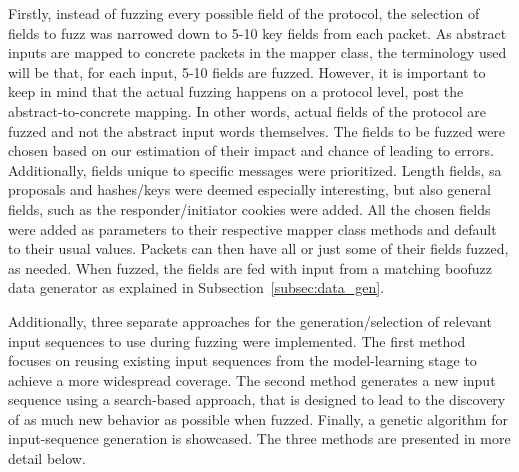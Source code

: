 Firstly, instead of fuzzing every possible field of the protocol, the selection of fields to fuzz was narrowed down to 5-10 key fields from each packet. As abstract inputs are mapped to concrete packets in the mapper class, the terminology used will be that, for each input, 5-10 fields are fuzzed. However, it is important to keep in mind that the actual fuzzing happens on a protocol level, post the abstract-to-concrete mapping. In other words, actual fields of the protocol are fuzzed and not the abstract input words themselves. The fields to be fuzzed were chosen based on our estimation of their impact and chance of leading to errors. Additionally, fields unique to specific messages were prioritized. Length fields, \ac{sa} proposals and hashes/keys were deemed especially interesting, but also general fields, such as the responder/initiator cookies were added. All the chosen fields were added as parameters to their respective mapper class methods and default to their usual values. Packets can then have all or just some of their fields fuzzed, as needed. When fuzzed, the fields are fed with input from a matching boofuzz data generator as explained in Subsection~\ref{subsec:data_gen}.

Additionally, three separate approaches for the generation/selection of relevant input sequences to use during fuzzing were implemented. The first method focuses on reusing existing input sequences from the model-learning stage to achieve a more widespread coverage. The second method generates a new input sequence using a search-based approach, that is designed to lead to the discovery of as much new behavior as possible when fuzzed. Finally, a genetic algorithm for input-sequence generation is showcased. The three methods are presented in more detail below.

